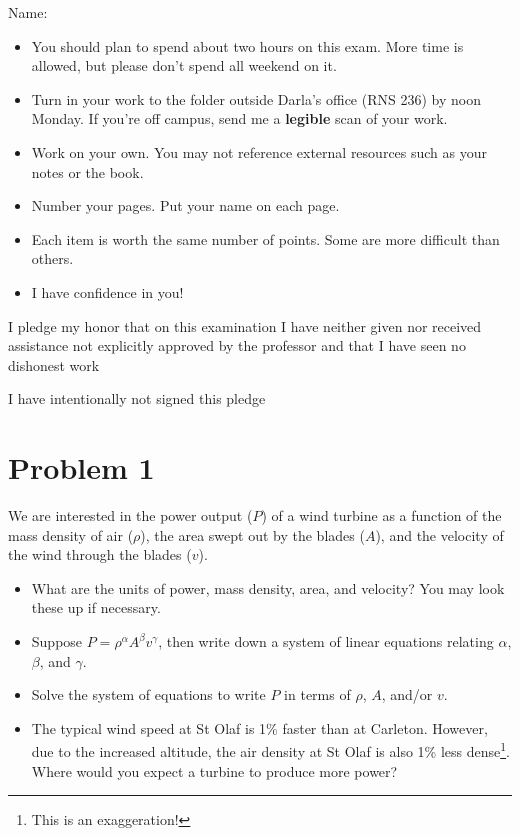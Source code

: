 \documentclass{article}
\begin{document}
Name: \makebox[2in]{\hrulefill}

\vspace{0.5in}

\begin{itemize}
    \item You should plan to spend about two hours on this exam. More time is allowed, but please don't spend all weekend on it.
    \item Turn in your work to the folder outside Darla's office (RNS 236) by noon Monday. If you're off campus, send me a \textbf{legible} scan of your work.
    \item Work on your own. You may not reference external resources such as your notes or the book.
    \item Number your pages. Put your name on each page.
    \item Each item is worth the same number of points. Some are more difficult than others.
    \item I have confidence in you!
\end{itemize}

\vfill

I pledge my honor that on this examination I have neither given nor received assistance not explicitly approved by the professor and that I have seen no dishonest work \makebox[2in]{\hrulefill}

\vspace{0.5in}

I have intentionally not signed this pledge \makebox[2in]{\hrulefill}

\newpage

\section*{Problem 1}

We are interested in the power output ($P$) of a wind turbine as a function of the mass density of air ($\rho$), the area swept out by the blades ($A$), and the velocity of the wind through the blades ($v$).

\begin{itemize}
    \item What are the units of power, mass density, area, and velocity? You may look these up if necessary.
    \item Suppose $P = \rho^{\alpha} A^{\beta} v^{\gamma}$, then write down a system of linear equations relating $\alpha$, $\beta$, and $\gamma$. 
    \item Solve the system of equations to write $P$ in terms of $\rho$, $A$, and/or $v$.
    \item The typical wind speed at St Olaf is 1\% faster than at Carleton. However, due to the increased altitude, the air density at St Olaf is also 1\% less dense\footnote{This is an exaggeration!}. Where would you expect a turbine to produce more power?
\end{itemize}
\end{document}
